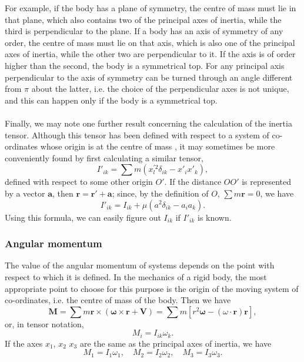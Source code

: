 For example, if the body has a plane of symmetry, the centre of mass must lie in that plane, which also contains two of the principal axes of inertia, while the third is perpendicular to the plane.
If a body has an axis of symmetry of any order, the centre of mass must lie on that axis, which is also one of the principal axes of inertia, while the other two are perpendicular to it.
If the axis is of order higher than the second, the body is a symmetrical top. For any principal axis perpendicular to the axis of symmetry can be turned through an angle different from $\pi$ about the latter, i.e. the choice of the perpendicular axes is not unique, and this can happen only if the body is a symmetrical top.
\\ \\
Finally, we may note one further result concerning the calculation of the inertia tensor. 
Although this tensor has been defined with respect to a system of co-ordinates whose origin is at the centre of mass , it may sometimes be more conveniently found by first calculating a similar tensor,
\[I'_{ik} = \sum m (x_l^{'2} \delta_{ik} - x'_i x'_k), \]
defined with respect to some other origin $O'$. 
If the distance $OO'$ is represented by a vector $\bm{a}$, then $\bm{r} = \bm{r'} + \bm{a}$; since, by the definition
of $O$, $\sum m\bm{r} = 0$, we have
\[I'_{ik} = I_{ik} + \mu (a^2\delta_{ik}-a_i a_k).\]
Using this formula, we can easily figure out $I_{ik}$ if $I'_{ik}$ is known.

\subsubsection{Angular momentum}
The value of the angular momentum of systems depends on the point with respect to which it is defined. In the mechanics of a rigid body, the most appropriate point to choose for this purpose is the origin of the moving system of co-ordinates, i.e. the centre of mass of the body. Then we have
\[\bm{M} = \sum m\bm{r} \times (\bm{\omega} \times \bm{r} + \bm{V}) = \sum m \left [ r^2\bm{\omega} - (\omega \cdot \bm{r})\bm{r} \right ],\]
or, in tensor notation,
\[M_i = I_{ik}\omega_k.\]
If the axes $x_1$, $x_2$ $x_3$ are the same as the principal axes of inertia, we have
\[M_1 = I_1 \omega_1 ,\quad M_2 = I_2 \omega_2 ,\quad M_3 = I_3 \omega_3.\]

